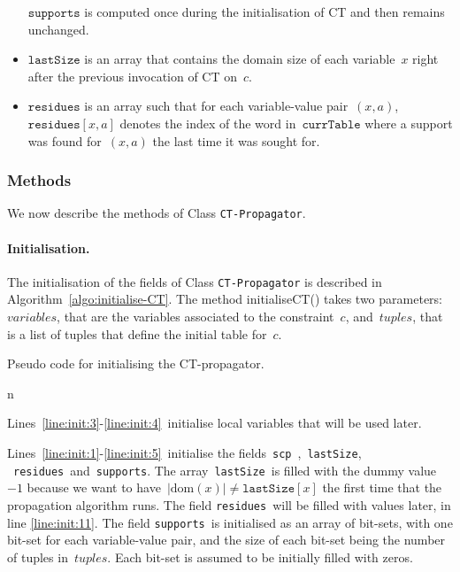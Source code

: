 \documentclass[a4paper,11pt]{article}
\newcommand{\Algoref}[1]{Algorithm~\ref{#1}}
\newcommand{\Linesref}[2]{Lines~\ref{#1}-\ref{#2}}
\newcommand{\Dom}[1]{\text{dom}({#1})}
\newcommand{\Scp}{\texttt{scp}}
\newcommand{\CurrTable}{\texttt{currTable}}
\newcommand{\LastSizes}{\texttt{lastSize}}
\newcommand{\Supports}{\texttt{supports}}
\newcommand{\Residues}{\texttt{residues}}
\newcommand{\localvar}[1]{\mathit{#1}}
\numberwithin{equation}{section}
\begin{document}
\begin{itemize}
    $\Supports$ is computed once during the initialisation of CT and then
    remains unchanged.
    
  \item $\LastSizes$ is an array that contains the domain size of each
    variable~$x$ right after the previous invocation of CT on~$c$.

  \item $\Residues$ is an array such that for each variable-value pair~$(x,a)$,
    $\Residues[x,a]$ denotes the index of the word in~$\CurrTable$ where a support
    was found for~$(x,a)$ the last time it was sought for.

\end{itemize}

\subsubsection{Methods}

We now describe the methods of Class \texttt{CT-Propagator}.

\paragraph{Initialisation.}
The initialisation of the fields of Class \texttt{CT-Propagator} is described in
\Algoref{algo:initialise-CT}. The method initialiseCT() takes two parameters:
$\localvar{variables}$, that are the variables associated to the constraint~$c$,
and~$\localvar{tuples}$, that is a list of tuples that define the initial table for~$c$.

\begin{algorithm}[H]
  \begin{algorithmic}[1]  %
    
  \end{algorithmic}
  \caption{Pseudo code for initialising the CT-propagator.}
  \label{algo:initialise-CT}
\end{algorithm}n

\Linesref{line:init:3}{line:init:4}~initialise local variables that will be 
used later.

\Linesref{line:init:1}{line:init:5}~initialise the fields~\Scp~,~\LastSizes,
~\Residues~and~\Supports.
The array~\LastSizes~is filled with 
the dummy value~$-1$ because we
want to have~$|\Dom{x}| \neq \LastSizes[x]$ the first time that the propagation
algorithm runs. The field \Residues~will be filled with values later, 
in line \ref{line:init:11}.
The field \Supports~is initialised as an array of bit-sets, with one bit-set for each
variable-value pair, and the size of each
bit-set being the number of tuples in~$\localvar{tuples}$. Each bit-set is assumed
to be initially filled with zeros.
\end{document}
